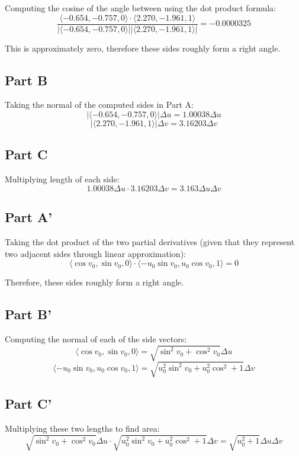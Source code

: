 \documentclass{article}
\begin{document}
Computing the cosine of the angle between using the dot product formula:
$$ \frac{\langle -0.654, -0.757, 0 \rangle \cdot \langle 2.270, -1.961, 1 \rangle}{\vert \langle -0.654, -0.757, 0
\rangle\vert \vert\langle 2.270, -1.961, 1 \rangle \vert} = -0.0000325 $$

This is approximately zero, therefore these sides roughly form a right angle.

\subsection*{Part B}

Taking the normal of the computed sides in Part A:
$$ \vert \langle -0.654, -0.757, 0 \rangle \vert \Delta u = 1.00038 \Delta u $$
$$ \vert \langle 2.270, -1.961, 1 \rangle \vert \Delta v = 3.16203 \Delta v $$

\subsection*{Part C}

Multiplying length of each side:
$$ 1.00038 \Delta u \cdot 3.16203 \Delta v = 3.163 \Delta u \Delta v $$

\subsection*{Part A'}

Taking the dot product of the two partial derivatives (given that they represent
two adjacent sides through linear approximation):
$$ \langle \cos v_0, \sin v_0, 0 \rangle \cdot \langle -u_0 \sin v_0, u_0 \cos
v_0, 1 \rangle = 0 $$

Therefore, these sides roughly form a right angle.

\subsection*{Part B'}

Computing the normal of each of the side vectors:
$$  \langle \cos v_0, \sin v_0, 0 \rangle = \sqrt{ \sin^2 v_0 + \cos^2 v_0 }
\Delta u $$
$$ \langle -u_0 \sin v_0, u_0 \cos v_0, 1 \rangle = \sqrt{ u_0^2 \sin^2 v_0 +
u_0^2 \cos^2 + 1} \Delta v $$

\subsection*{Part C'}

Multiplying these two lengths to find area:
$$ \sqrt{ \sin^2 v_0 + \cos^2 v_0 } \Delta u \cdot \sqrt{ u_0^2 \sin^2 v_0 +
u_0^2 \cos^2 + 1} \Delta v = \sqrt{u_0^2 + 1} \Delta u \Delta v $$
\end{document}
